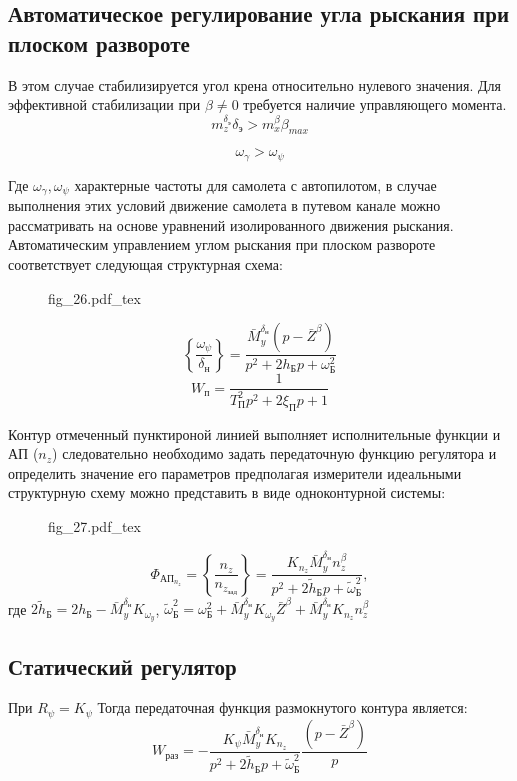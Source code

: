 \documentclass{article}
\begin{document}
\subsection{Автоматическое регулирование угла рыскания при плоском развороте}
В этом случае стабилизируется угол крена относительно нулевого значения. Для эффективной стабилизации при $\beta \neq 0$ требуется наличие управляющего момента.
\[
	m_z^{\delta_\text{э}} \delta_\text{э} > m_x^\beta \beta_{max}
\]

\[
	\omega_{\gamma} > \omega_{\psi}
\]

Где $\omega_{\gamma}, \omega_{\psi}$ характерные частоты для самолета с автопилотом, в случае выполнения этих условий движение самолета в путевом канале можно рассматривать на основе уравнений изолированного движения рыскания. Автоматическим управлением углом рыскания при плоском развороте соответствует следующая структурная схема:

\begin{figure}[H]
	\centering
	{fig_26.pdf_tex}
\end{figure}

\[
	\left\{\frac{\omega_{\psi}}{\delta_\text{н}}\right\} =\frac{\bar{M}_y^{\delta_\text{н}}(p - \bar{Z}^\beta)}{p^2 + 2h_\text{Б} p + \omega_\text{Б}^2} 
\]
\[
	W_\text{п} = \frac{1}{T_\text{П}^2 p^2 + 2\xi_\text{П} p + 1}
\]

Контур отмеченный пунктироной линией выполняет исполнительные функции и АП ($n_z$) следовательно необходимо задать передаточную функцию регулятора и определить значение его параметров предполагая измерители идеальными структурную схему можно представить в виде одноконтурной системы:

\begin{figure}[H]
	\centering
	{fig_27.pdf_tex}
\end{figure}


\[
	\Phi_{\text{АП}_{n_z}} = \left\{\frac{n_z}{n_{z_\text{зад}}} \right\} =\frac{K_{n_z}\bar{M}_y^{\delta_\text{н}} n_z^\beta}{p^2 + 2 \tilde{h}_\text{Б} p + \tilde{\omega}_\text{Б}^2},
\]
где $2\tilde{h}_\text{Б} = 2h_\text{Б} -\bar{M}_y^{\delta_\text{н}} K_{{\omega}_y}$, $\tilde{\omega}_\text{Б}^2 = \omega_\text{Б}^2 +\bar{M}_y^{\delta_\text{н}}K_{\omega_y}\bar{Z}^\beta + \bar{M}_y^{\delta_\text{н}} K_{n_z}n_z^\beta$

\subsection{Статический регулятор}
При $R_\psi = K_\psi$
Тогда передаточная функция размокнутого контура является:
\[
	W_\text{раз} = -\frac{K_{\psi} \bar{M}_y^{\delta_\text{н}} K_{n_z}}{p^2 + 2 \tilde{h}_\text{Б} p + \tilde{\omega}_\text{Б}^2} \frac{(p - \bar{Z}^\beta)}{p}
\]
\end{document}
